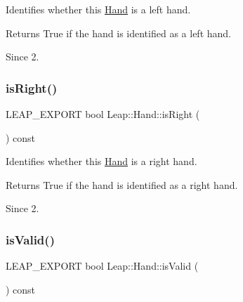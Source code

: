 Identifies whether this \hyperlink{class_leap_1_1_hand}{Hand} is a left hand.


\begin{DoxyCodeInclude}
\end{DoxyCodeInclude}


\begin{DoxyReturn}{Returns}
True if the hand is identified as a left hand. 
\end{DoxyReturn}
\begin{DoxySince}{Since}
2. 
\end{DoxySince}
\mbox{\label{class_leap_1_1_hand_aeff477c4cb80ac3fd7e76db4911c300a}} 
\subsubsection{\texorpdfstring{is\+Right()}{isRight()}}
{\footnotesize\ttfamily L\+E\+A\+P\+\_\+\+E\+X\+P\+O\+RT bool Leap\+::\+Hand\+::is\+Right (\begin{DoxyParamCaption}{ }\end{DoxyParamCaption}) const}

Identifies whether this \hyperlink{class_leap_1_1_hand}{Hand} is a right hand.


\begin{DoxyCodeInclude}
\end{DoxyCodeInclude}


\begin{DoxyReturn}{Returns}
True if the hand is identified as a right hand. 
\end{DoxyReturn}
\begin{DoxySince}{Since}
2. 
\end{DoxySince}
\mbox{\label{class_leap_1_1_hand_a596f55bc25a088c0a1760bbbca5ec2a8}} 
\subsubsection{\texorpdfstring{is\+Valid()}{isValid()}}
{\footnotesize\ttfamily L\+E\+A\+P\+\_\+\+E\+X\+P\+O\+RT bool Leap\+::\+Hand\+::is\+Valid (\begin{DoxyParamCaption}{ }\end{DoxyParamCaption}) const}

